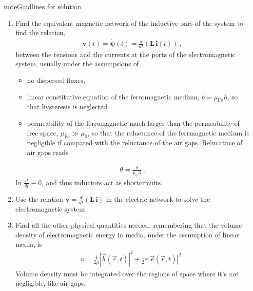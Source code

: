 \documentclass[letterpaper,10pt,english]{jupyterBook}
\begin{document}
\begin{sphinxadmonition}{note}{Guidlines for solution}
\begin{enumerate}
%
\item {} 
\sphinxAtStartPar
Find the equivalent magnetic network of the inductive part of the system to find the relation,
\begin{equation*}
\begin{split}\mathbf{v}(t) = \dot{\symbf{\psi}}(t) = \frac{d}{dt} \left( \mathbf{L} \, \mathbf{i}(t) \right) \ ,\end{split}
\end{equation*}
\sphinxAtStartPar
between the tensions and the currents at the ports of the electromagnetic system, usually under the assumpsions of
\begin{itemize}
\item {} 
\sphinxAtStartPar
no dispersed fluxes,

\item {} 
\sphinxAtStartPar
linear constitutive equation of the ferromagnetic medium, \(b = \mu_{\text{Fe}} h\), so that hysteresis is neglected

\item {} 
\sphinxAtStartPar
permeability of the ferromagnetic much larger than the permeability of free space, \(\mu_{\text{Fe}} \gg \mu_0\), so that the reluctance of the ferrmagnetic medium is negligible if compared with the reluctance of the air gaps. Relucatnce of air gaps reads

\end{itemize}
\begin{equation*}
\begin{split}\theta = \frac{\delta}{\mu_0 A} \ .\end{split}
\end{equation*}
\sphinxAtStartPar
In  \(\frac{d}{dt} \equiv 0\), and thus inductors act as short\sphinxhyphen{}circuits.

\item {} 
\sphinxAtStartPar
Use the relation \(\mathbf{v} = \frac{d}{dt} \left( \mathbf{L} \, \mathbf{i} \right)\) in the electric network to solve the electromagnetic system

\item {} 
\sphinxAtStartPar
Find all the other physical quantities needed, remembering that the volume density of electromagnetic energy in media, under the assumption of linear media, is
\begin{equation*}
\begin{split}u = \frac{1}{2 \mu} \left|\vec{b}(\vec{r},t)\right|^2 + \frac{1}{2} \varepsilon \left|\vec{e}(\vec{r},t)\right|^2 \ .\end{split}
\end{equation*}
\sphinxAtStartPar
Volume density must be integrated over the regions of space where it’s not negligible, like air gaps.

\end{enumerate}
\end{sphinxadmonition}
 \label{exercise:exam-25-01-22-exe-03}
\end{document}
